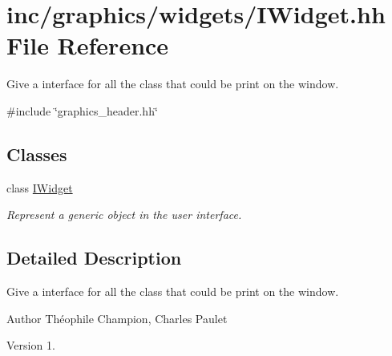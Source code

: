 \hypertarget{IWidget_8hh}{}\section{inc/graphics/widgets/\+I\+Widget.hh File Reference}
\label{IWidget_8hh}


Give a interface for all the class that could be print on the window.  


{\ttfamily \#include \char`\"{}graphics\+\_\+header.\+hh\char`\"{}}\newline
\subsection*{Classes}
\begin{DoxyCompactItemize}
\item 
class \hyperlink{classIWidget}{I\+Widget}
\begin{DoxyCompactList}\small\item\em Represent a generic object in the user interface. \end{DoxyCompactList}\end{DoxyCompactItemize}


\subsection{Detailed Description}
Give a interface for all the class that could be print on the window. 

\begin{DoxyAuthor}{Author}
Théophile Champion, Charles Paulet 
\end{DoxyAuthor}
\begin{DoxyVersion}{Version}
1. 
\end{DoxyVersion}
